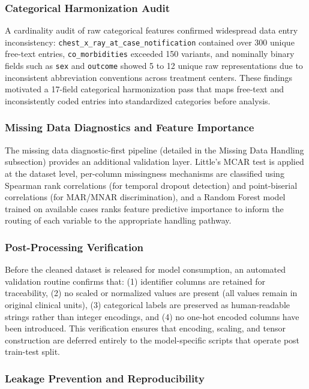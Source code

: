 \documentclass[12pt]{article}
\begin{document}
\subsubsection*{Categorical Harmonization Audit}

A cardinality audit of raw categorical features confirmed widespread data entry inconsistency: \texttt{chest\_x\_ray\_at\_case\_notification} contained over 300 unique free-text entries, \texttt{co\_morbidities} exceeded 150 variants, and nominally binary fields such as \texttt{sex} and \texttt{outcome} showed 5 to 12 unique raw representations due to inconsistent abbreviation conventions across treatment centers. These findings motivated a 17-field categorical harmonization pass that maps free-text and inconsistently coded entries into standardized categories before analysis.

\subsubsection*{Missing Data Diagnostics and Feature Importance}

The missing data diagnostic-first pipeline (detailed in the Missing Data Handling subsection) provides an additional validation layer. Little's MCAR test is applied at the dataset level, per-column missingness mechanisms are classified using Spearman rank correlations (for temporal dropout detection) and point-biserial correlations (for MAR/MNAR discrimination), and a Random Forest model trained on available cases ranks feature predictive importance to inform the routing of each variable to the appropriate handling pathway.

\subsubsection*{Post-Processing Verification}

Before the cleaned dataset is released for model consumption, an automated validation routine confirms that: (1) identifier columns are retained for traceability, (2) no scaled or normalized values are present (all values remain in original clinical units), (3) categorical labels are preserved as human-readable strings rather than integer encodings, and (4) no one-hot encoded columns have been introduced. This verification ensures that encoding, scaling, and tensor construction are deferred entirely to the model-specific scripts that operate post train-test split.

\subsubsection*{Leakage Prevention and Reproducibility}
\end{document}
